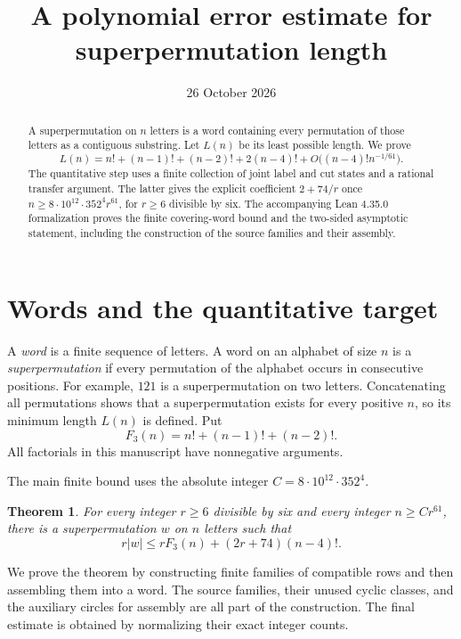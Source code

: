 \documentclass[11pt]{article}
\title{A polynomial error estimate for superpermutation length}
\author{}
\date{26 October 2026}
\newtheorem{theorem}{Theorem}[section]
\theoremstyle{definition}
\theoremstyle{remark}
\begin{document}
\maketitle
\begin{abstract}
A superpermutation on $n$ letters is a word containing every permutation
of those letters as a contiguous substring. Let $L(n)$ be its least possible
length. We prove
\[
 L(n)=n!+(n-1)!+(n-2)!+2(n-4)!
       +O\bigl((n-4)!n^{-1/61}\bigr).
\]
The quantitative step uses a finite collection of joint label and cut
states and a rational transfer argument. The latter gives the explicit
coefficient $2+74/r$ once $n\ge 8\cdot10^{12}\cdot352^4r^{61}$, for
$r\ge6$ divisible by six. The accompanying Lean 4.35.0 formalization proves
the finite covering-word bound and the two-sided asymptotic statement,
including the construction of the source families and their assembly.
\end{abstract}

\section{Words and the quantitative target}

A \emph{word} is a finite sequence of letters. A word on an alphabet of
size $n$ is a \emph{superpermutation} if every permutation of the alphabet
occurs in consecutive positions. For example, $121$ is a superpermutation
on two letters. Concatenating all permutations shows that a superpermutation
exists for every positive $n$, so its minimum length $L(n)$ is defined.
Put
\[
 F_3(n)=n!+(n-1)!+(n-2)!.
\]
All factorials in this manuscript have nonnegative arguments.

The main finite bound uses the absolute integer
$C=8\cdot10^{12}\cdot352^4$.

\begin{theorem}\label{thm-main-finite}
For every integer $r\ge6$ divisible by six and every integer
$n\ge Cr^{61}$, there is a superpermutation $w$ on $n$ letters such that
\begin{equation}\label{eq-main-finite}
 r|w|\le rF_3(n)+(2r+74)(n-4)!.
\end{equation}
\end{theorem}

We prove the theorem by constructing finite families of compatible rows
and then assembling them into a word. The source families, their unused
cyclic classes, and the auxiliary circles for assembly are all part of
the construction. The final estimate is obtained by normalizing their
exact integer counts.
\end{document}
